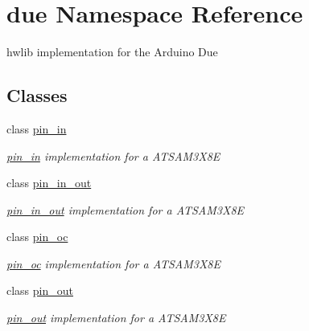 \hypertarget{namespacedue}{}\section{due Namespace Reference}
\label{namespacedue}


hwlib implementation for the Arduino Due  


\subsection*{Classes}
\begin{DoxyCompactItemize}
\item 
class \hyperlink{classdue_1_1pin__in}{pin\+\_\+in}
\begin{DoxyCompactList}\small\item\em \hyperlink{classdue_1_1pin__in}{pin\+\_\+in} implementation for a A\+T\+S\+A\+M3\+X8E \end{DoxyCompactList}\item 
class \hyperlink{classdue_1_1pin__in__out}{pin\+\_\+in\+\_\+out}
\begin{DoxyCompactList}\small\item\em \hyperlink{classdue_1_1pin__in__out}{pin\+\_\+in\+\_\+out} implementation for a A\+T\+S\+A\+M3\+X8E \end{DoxyCompactList}\item 
class \hyperlink{classdue_1_1pin__oc}{pin\+\_\+oc}
\begin{DoxyCompactList}\small\item\em \hyperlink{classdue_1_1pin__oc}{pin\+\_\+oc} implementation for a A\+T\+S\+A\+M3\+X8E \end{DoxyCompactList}\item 
class \hyperlink{classdue_1_1pin__out}{pin\+\_\+out}
\begin{DoxyCompactList}\small\item\em \hyperlink{classdue_1_1pin__out}{pin\+\_\+out} implementation for a A\+T\+S\+A\+M3\+X8E \end{DoxyCompactList}\end{DoxyCompactItemize}
